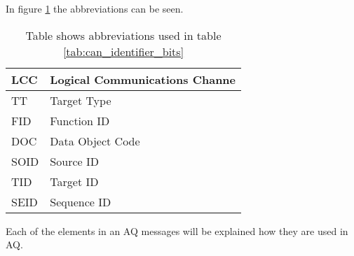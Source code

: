 \begin{table}[H]
	\caption{Table shows the identifier bits used in AutoQuad CAN messages}
	\label{tab:can_identifier_bits}
\end{table}

In figure \ref{tab:abbri_can_msg} the abbreviations can be seen.
\begin{table}[H]
		\begin{tabular}{|l|l|}
		\hline
		LCC & Logical Communications Channe \\
\hline
		TT & Target Type \\
\hline
		FID & Function ID \\
\hline
		DOC & Data Object Code \\
\hline
		SOID & Source ID \\
\hline
		TID & Target ID \\
\hline
		SEID & Sequence ID \\
\hline
		\end{tabular}
		\caption{Table shows 
abbreviations used in table \ref{tab:can_identifier_bits}}
		\label{tab:abbri_can_msg}
\end{table}

Each of the elements in an AQ messages will be explained how they are used in AQ. \\